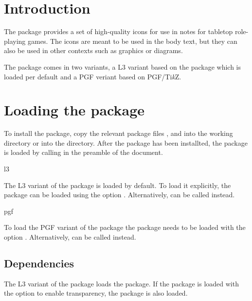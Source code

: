 \documentclass[a4paper]{article}
\begin{document}
\vspace*{-1cm}
\noindent\dndiconslogo[4]

\bigskip

\printdoctitle

\bigskip

\section{Introduction}

The  package provides a set of high-quality icons for use in notes for tabletop role-playing games. The icons are meant to be used in the body text, but they can also be used in other contexts such as graphics or diagrams.

The package comes in two variants, a L3 variant based on the  package which is loaded per default and a PGF veriant based on PGF/Ti\emph{k}Z.

\section{Loading the package}

To install the package, copy the relevant package files ,  and  into the working directory or into the  directory. After the package has been installted, the  package is loaded by calling \macro{\usepackage{dndicons}} in the preamble of the document. 

\begin{macrodef}l3\end{macrodef}
The L3 variant of the package is loaded by default. To load it explicitly, the package can be loaded using the option . Alternatively, \macro{\usepackage{dndicons-l3}} can be called instead.

\begin{macrodef}pgf\end{macrodef}
To load the PGF variant of the package the package needs to be loaded with the option . Alternatively, \macro{\usepackage{dndicons-pgf}} can be called instead.

\subsection{Dependencies}

The L3 variant of the package loads the  package. If the package is loaded with the  option to enable transparency, the  package is also loaded.
\end{document}
